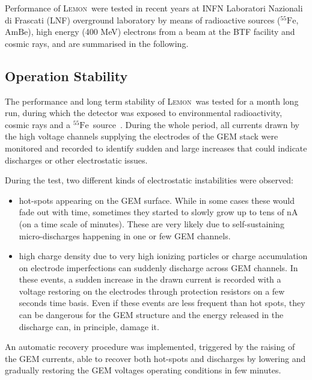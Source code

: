\documentclass[physics,article,submit,moreauthors,pdftex]{Definitions/mdpi}
\newcommand{\fe}{\ensuremath{^{55}\textrm{Fe}}\xspace}
\newcommand{\ambe}{\ensuremath{\textrm{Am} \textrm{Be}}\xspace}
\newcommand{\lemon}{{\textsc{Lemon}}\xspace}
\begin{document}
Performance of \lemon\ were tested in recent years at INFN Laboratori Nazionali di Frascati (LNF) overground laboratory by means of radioactive sources (\fe, \ambe), high energy (400 MeV) electrons from a beam at the BTF facility \cite{bib:btf1,bib:btf2} and cosmic rays, and are summarised in the following.

\subsection{Operation Stability}\label{sec:stability}

The performance and long term stability of \lemon\ was
tested for a month long run, during which the detector was exposed to environmental radioactivity, cosmic rays and a \fe~source~\cite{bib:fe55New}. During the whole period, all currents drawn by the high voltage channels supplying the electrodes of the GEM stack were monitored and recorded to identify sudden and large increases that could indicate discharges or other electrostatic issues.

During the test, two different kinds of electrostatic instabilities were observed:

\begin{itemize}
    \item hot-spots appearing on the GEM surface. While in some  cases these would fade out with time, sometimes they started to slowly grow up to tens of nA (on a time scale of minutes). These are very likely due to self-sustaining micro-discharges happening in one or few GEM channels. 
    
    \item high charge density due to very high ionizing particles or charge accumulation on electrode imperfections can suddenly discharge across GEM channels. In these events, a sudden increase in the drawn current is recorded with a voltage restoring on the electrodes through protection resistors on a few seconds time basis.  Even if these events are less frequent than hot spots, they can be dangerous for the GEM structure and the energy released in the discharge can, in principle, damage it. 
\end{itemize}

An automatic recovery procedure was implemented, triggered by the raising of the GEM currents, able to recover both hot-spots and discharges by lowering and gradually restoring the GEM voltages operating conditions in few minutes.
\end{document}
